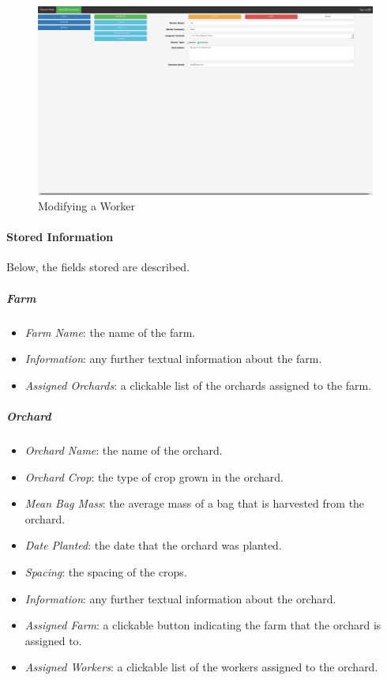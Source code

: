 \documentclass[11pt]{article}
\begin{document}
\begin{figure}
 \centering
 \includegraphics[width=12cm, keepaspectratio]{Images/webInformation-Mod-Worker.png}
 \caption{Modifying a Worker}
 \label{InformationModJoe}
\end{figure}

\paragraph{Stored Information}
Below, the fields stored are described.
\subparagraph{Farm}
\begin{itemize}
 \item \textit{Farm Name}: the name of the farm.
 \item \textit{Information}: any further textual information about the farm.
 \item \textit{Assigned Orchards}: a clickable list of the orchards assigned to the farm.
\end{itemize}

\subparagraph{Orchard}
\begin{itemize}
 \item \textit{Orchard Name}: the name of the orchard.
\item \textit{Orchard Crop}: the type of crop grown in the orchard.
\item \textit{Mean Bag Mass}: the average mass of a bag that is harvested from the orchard.
\item \textit{Date Planted}: the date that the orchard was planted.
\item \textit{Spacing}: the spacing of the crops.
\item \textit{Information}: any further textual information about the orchard.
\item \textit{Assigned Farm}: a clickable button indicating the farm that the orchard is assigned to.
\item \textit{Assigned Workers}: a clickable list of the workers assigned to the orchard.
\end{itemize}
\end{document}
